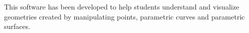 This software has been developed to help students understand and visualize
geometries created by manipulating points, parametric curves and parametric
surfaces.

